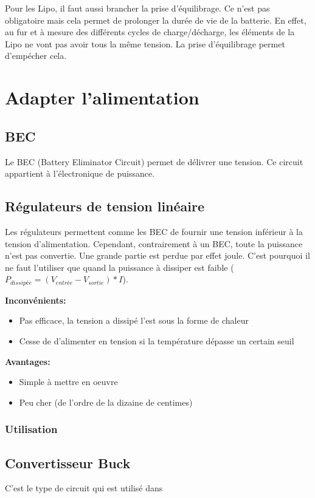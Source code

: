 \documentclass[a4paper, 11pt]{report}
\begin{document}
Pour les Lipo, il faut aussi brancher la prise d'équilibrage. Ce n'est pas obligatoire mais cela permet de prolonger la durée de vie de la batterie. En effet, au fur et à mesure des différents cycles de charge/décharge, les éléments de la Lipo ne vont pas avoir tous la même tension. La prise d'équilibrage permet d'empécher cela.


\section{Adapter l'alimentation}

\subsection{BEC}
Le BEC (Battery Eliminator Circuit) permet de délivrer une tension. Ce circuit appartient à l'électronique de puissance.

\subsection{Régulateurs de tension linéaire}
Les régulateurs permettent comme les BEC de fournir une tension inférieur à la tension d'alimentation. Cependant, contrairement à un BEC, toute la puissance n'est pas convertie. Une grande partie est perdue par effet joule. C'est pourquoi il ne faut l'utiliser que quand la puissance à dissiper est faible ($P_{dissipée} = (V_{entrée} - V_{sortie})*I$).

\textbf{Inconvénients:}
\begin{itemize}
\item Pas efficace, la tension a dissipé l'est sous la forme de chaleur
\item Cesse de d'alimenter en tension si la température dépasse un certain seuil
\end{itemize}

\textbf{Avantages:}
\begin{itemize}
\item Simple à mettre en oeuvre
\item Peu cher (de l'ordre de la dizaine de centimes)
\end{itemize}

\subsubsection{Utilisation}


\subsection{Convertisseur Buck}
C'est le type de circuit qui est utilisé dans 
\end{document}

